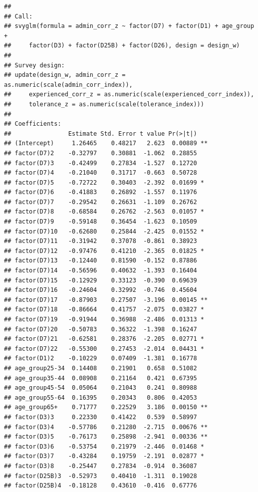 \documentclass[
]{article}
\begin{document}
\begin{verbatim}
## 
## Call:
## svyglm(formula = admin_corr_z ~ factor(D7) + factor(D1) + age_group + 
##     factor(D3) + factor(D25B) + factor(D26), design = design_w)
## 
## Survey design:
## update(design_w, admin_corr_z = as.numeric(scale(admin_corr_index)), 
##     experienced_corr_z = as.numeric(scale(experienced_corr_index)), 
##     tolerance_z = as.numeric(scale(tolerance_index)))
## 
## Coefficients:
##                Estimate Std. Error t value Pr(>|t|)   
## (Intercept)     1.26465    0.48217   2.623  0.00889 **
## factor(D7)2    -0.32797    0.30881  -1.062  0.28855   
## factor(D7)3    -0.42499    0.27834  -1.527  0.12720   
## factor(D7)4    -0.21040    0.31717  -0.663  0.50728   
## factor(D7)5    -0.72722    0.30403  -2.392  0.01699 * 
## factor(D7)6    -0.41883    0.26892  -1.557  0.11976   
## factor(D7)7    -0.29542    0.26631  -1.109  0.26762   
## factor(D7)8    -0.68584    0.26762  -2.563  0.01057 * 
## factor(D7)9    -0.59148    0.36454  -1.623  0.10509   
## factor(D7)10   -0.62680    0.25844  -2.425  0.01552 * 
## factor(D7)11   -0.31942    0.37078  -0.861  0.38923   
## factor(D7)12   -0.97476    0.41210  -2.365  0.01825 * 
## factor(D7)13   -0.12440    0.81590  -0.152  0.87886   
## factor(D7)14   -0.56596    0.40632  -1.393  0.16404   
## factor(D7)15   -0.12929    0.33123  -0.390  0.69639   
## factor(D7)16   -0.24604    0.32992  -0.746  0.45604   
## factor(D7)17   -0.87903    0.27507  -3.196  0.00145 **
## factor(D7)18   -0.86664    0.41757  -2.075  0.03827 * 
## factor(D7)19   -0.91944    0.36988  -2.486  0.01313 * 
## factor(D7)20   -0.50783    0.36322  -1.398  0.16247   
## factor(D7)21   -0.62581    0.28376  -2.205  0.02771 * 
## factor(D7)22   -0.55300    0.27453  -2.014  0.04431 * 
## factor(D1)2    -0.10229    0.07409  -1.381  0.16778   
## age_group25-34  0.14408    0.21901   0.658  0.51082   
## age_group35-44  0.08908    0.21164   0.421  0.67395   
## age_group45-54  0.05064    0.21043   0.241  0.80988   
## age_group55-64  0.16395    0.20343   0.806  0.42053   
## age_group65+    0.71777    0.22529   3.186  0.00150 **
## factor(D3)3     0.22330    0.41422   0.539  0.58997   
## factor(D3)4    -0.57786    0.21280  -2.715  0.00676 **
## factor(D3)5    -0.76173    0.25898  -2.941  0.00336 **
## factor(D3)6    -0.53754    0.21979  -2.446  0.01468 * 
## factor(D3)7    -0.43284    0.19759  -2.191  0.02877 * 
## factor(D3)8    -0.25447    0.27834  -0.914  0.36087   
## factor(D25B)3  -0.52973    0.40410  -1.311  0.19028   
## factor(D25B)4  -0.18128    0.43610  -0.416  0.67776   

\end{verbatim}
\end{document}

